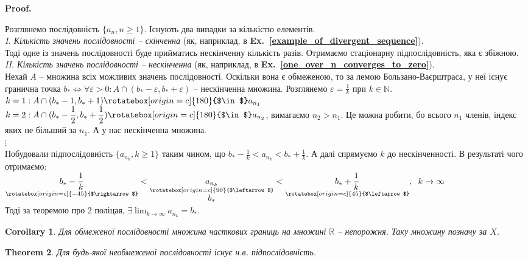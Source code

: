 \documentclass[a4paper, 14pt]{article}
\makeatletter
\def\qed{$\blacksquare$}
\theoremstyle{theoremdd}
\newtheorem{theorem}{Theorem}[subsection]
\theoremstyle{theoremdd}
\theoremstyle{theoremdd}
\theoremstyle{theoremdd}
\theoremstyle{theoremdd}
\theoremstyle{theoremdd}
\theoremstyle{theoremdd}
\theoremstyle{theoremdd}
\newtheorem{corollary}[theorem]{Corollary}
\renewenvironment{proof}[1][Proof.\\]{\par
\pushQED{\hfill \qed}%
\normalfont \topsep6\p@\@plus6\p@\relax
\trivlist
\item\relax
{\bfseries
#1\@addpunct{.}}\hspace\labelsep\ignorespaces
}{%
\popQED\endtrivlist\@endpefalse
}
\newcommand\exref[1]{\textbf{Ex.~\ref{#1}}}
\makeatother
\begin{document}
	\begin{proof}
	Розглянемо послідовність $\{a_n, n \geq 1\}$. Існують два випадки за кількістю елементів.
	\bigskip \\
	\textit{I. Кількість значень послідовності -- скінченна} (як, наприклад, в \exref{example_of_divergent_sequence}). \\
	Тоді одне із значень послідовності буде прийматись нескінченну кількість разів. Отримаємо стаціонарну підпослідовність, яка є збіжною.
	\bigskip \\
	\textit{II. Кількість значень послідовності -- нескінченна} (як, наприклад, в \exref{one_over_n_converges_to_zero}). \\
	Нехай $A$ -- множина всіх можливих значень послідовності. Оскільки вона є обмеженою, то за лемою Бользано-Ваєрштраса, у неї існує гранична точка $b_* \iff \forall \varepsilon > 0:A \cap (b_*-\varepsilon, b_*+\varepsilon)$ -- нескінченна множина. Розглянемо $\varepsilon = \displaystyle \frac{1}{k}$ при $k \in \mathbb{N}$.\\
	$\displaystyle k = 1: A \cap(b_*-1, b_*+1) \rotatebox[origin=c]{180}{$\in$}a_{n_1}$\\
	$\displaystyle k = 2: A \cap(b_*-\frac{1}{2}, b_*+\frac{1}{2}) \rotatebox[origin=c]{180}{$\in$}a_{n_2}$, вимагаємо $n_2>n_1$. Це можна робити, бо всього $n_1$ членів, індекс яких не більший за $n_1$. А у нас нескінченна множина.\\
	$\vdots$\\
	Побудовали підпослідовність $\{a_{n_k}, k \geq 1\}$ таким чином, що $\displaystyle b_*-\frac{1}{k} < a_{n_k} < b_*+\frac{1}{k}$. А далі спрямуємо $k$ до нескінченності. В результаті чого отримаємо:\\
	$\displaystyle \underset{\rotatebox[origin=c]{-45}{$\rightarrow$}}{b_*-\frac{1}{k}} < \underset{\underset{\displaystyle b_*}{\rotatebox[origin=c]{90}{$\leftarrow$}}}{a_{n_k}} < \underset{\rotatebox[origin=c]{45}{$\leftarrow$}}{b_*+\frac{1}{k}}, \hspace{0.2cm} k \to \infty$\\
	Тоді за теоремою про 2 поліцая, $\displaystyle \exists \lim_{k \to \infty} a_{n_k} = b_*$.
	\end{proof}
	
	\begin{corollary}
	Для обмеженої послідовності множина часткових границь на множині $\mathbb{R}$ -- непорожня. Таку множину позначу за $X$.
	\end{corollary}
		
	\begin{theorem} Для будь-якої необмеженої послідовності існує н.в. підпослідовність.
	\end{theorem}
	
\end{document}
